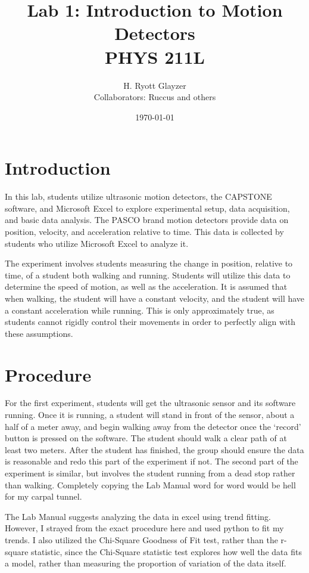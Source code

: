 \documentclass[hidelinks, 12pt, letterpaper]{article}
\title{\textbf{Lab 1:  Introduction to Motion Detectors}\\PHYS 211L}
\author{H. Ryott Glayzer\\Collaborators: Ruccus and others}
\date{\today}
\begin{document}
\hypersetup{bookmarksnumbered=true,}
\maketitle

\begin{large}
\tableofcontents
\end{large}%
\pagebreak

\section{Introduction}
In this lab, students utilize ultrasonic motion detectors,
the CAPSTONE software, and Microsoft Excel to explore 
experimental setup, data acquisition, and basic data analysis.
The PASCO brand motion detectors provide data on position, velocity,
and acceleration relative to time.
This data is collected by students who utilize Microsoft Excel to 
analyze it.

The experiment involves students measuring the change in position,
relative to time, of a student both walking and running. 
Students will utilize this data to determine the speed of motion,
as well as the acceleration.
It is assumed that when walking, the student will have a constant velocity,
and the student will have a constant acceleration while running.
This is only approximately true, as students cannot rigidly control
their movements in order to perfectly align with these assumptions.

\section{Procedure}
For the first experiment, students will get the ultrasonic sensor and its 
software running.
Once it is running, a student will stand in front of the sensor, about a half 
of a meter away, and begin walking away from the detector once the `record' button 
is pressed on the software.
The student should walk a clear path of at least two meters.
After the student has finished, the group should ensure the data is reasonable and 
redo this part of the experiment if not.
The second part of the experiment is similar, but involves the student running
from a dead stop rather than walking.
Completely copying the Lab Manual word for word would be hell for my carpal tunnel.

The Lab Manual suggests analyzing the data in excel using trend fitting.
However, I strayed from the exact procedure here and used python to fit my trends.
I also utilized the Chi-Square Goodness of Fit test, rather than the r-square
statistic, since the Chi-Square statistic test explores how well the data fits a 
model, rather than measuring the proportion of variation of the data itself.
\end{document}
